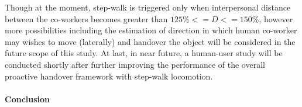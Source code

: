 Though at the moment, step-walk is triggered only when interpersonal distance between the co-workers becomes greater than $ 125\% <= D <= 150\% $, however more possibilities including the estimation of direction in which human co-worker may wishes to move (laterally) and handover the object will be considered in the future scope of this study. At last, in near future, a human-user study will be conducted shortly after further improving the performance of the overall proactive handover framework with step-walk locomotion.

\paragraph*{\LARGE {Conclusion \\}\\}

\clearpage %